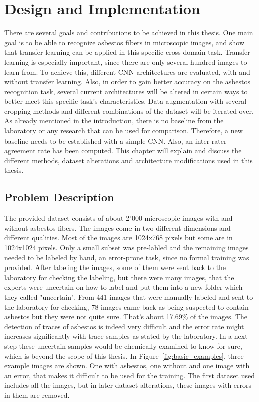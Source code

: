 \chapter{Design and Implementation}


There are several goals and contributions to be achieved in this thesis. One main goal is to be able to recognize asbestos fibers in microscopic images, and show that transfer learning can be applied in this specific cross-domain task. Transfer learning is especially important, since there are only several hundred images to learn from. To achieve this, different CNN architectures are evaluated, with and without transfer learning. Also, in order to gain better accuracy on the asbestos recognition task, several current architectures will be altered in certain ways to better meet this specific task's characteristics. Data augmentation with several cropping methods and different combinations of the dataset will be iterated over. As already mentioned in the introduction, there is no baseline from the laboratory or any research that can be used for comparison. Therefore, a new baseline needs to be established with a simple CNN. Also, an inter-rater agreement rate has been computed. This chapter will explain and discuss the different methods, dataset alterations and architecture modifications used in this thesis. 

\section{Problem Description}

The provided dataset consists of about 2'000 microscopic images with and without asbestos fibers. The images come in two different dimensions and different qualities. Most of the images are 1024x768 pixels but some are in 1024x1024 pixels. Only a small subset was pre-labled and the remaining images needed to be labeled by hand, an error-prone task, since no formal training was provided. After labeling the images, some of them were sent back to the laboratory for checking the labeling, but there were many images, that the experts were uncertain on how to label and put them into a new folder which they called  "uncertain". From 441 images that were manually labeled and sent to the laboratory for checking, 78 images came back as being suspected to contain asbestos but they were not quite sure. That's about 17.69\% of the images. The detection of traces of asbestos is indeed very difficult and the error rate might increases significantly with trace samples as stated by the laboratory. In a next step these uncertain samples would be chemically examined to know for sure, which is beyond the scope of this thesis. In Figure~\ref{fig:basic_examples}, three example images are shown. One with asbestos, one without and one image with an error, that makes it difficult to be used for the training. The first dataset used includes all the images, but in later dataset alterations, these images with errors in them are removed.

